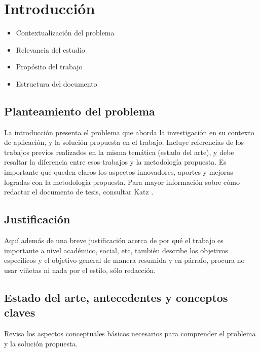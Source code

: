 \chapter{Introducción}

\begin{itemize}
    \item Contextualización del problema
    \item Relevancia del estudio 
    \item Propósito del trabajo 
    \item Estructura del documento 
\end{itemize}

\section{Planteamiento del problema}
La introducción presenta el problema que aborda la investigación en su contexto de aplicación, y la solución propuesta en el trabajo. Incluye referencias de los trabajos previos realizados en la misma temática (estado del arte), y debe resaltar la diferencia entre esos trabajos y la metodología propuesta. Es importante que queden claros los aspectos innovadores, aportes y mejoras logradas con la metodología propuesta. Para mayor información sobre cómo redactar el documento de tesis, consultar Katz \cite{abramson2015writing}.


\section{Justificación}
Aquí además de una breve justificación acerca de por qué el trabajo es importante a nivel académico, social, etc, también describe los objetivos específicos y el objetivo general de manera resumida y en párrafo, procura no usar viñetas ni nada por el estilo, sólo redacción.

\section{Estado del arte, antecedentes y conceptos claves}
Revisa los aspectos conceptuales básicos necesarios para comprender el problema y la solución propuesta.




